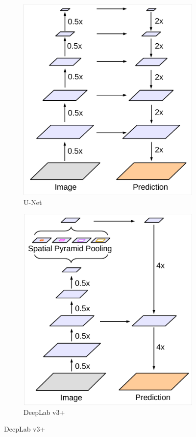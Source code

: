 \begin{description}
\begin{figure}[H]
\begin{subfigure}{0.3\linewidth}
                \includegraphics[width=0.9\linewidth]{./img/_deeplabv3plus_2.pdf}
                \caption{U-Net}
            \end{subfigure}
            \hfill
            \begin{subfigure}{0.3\linewidth}
                \centering
                \includegraphics[width=0.9\linewidth]{./img/_deeplabv3plus_3.pdf}
                \caption{DeepLab v3+}
            \end{subfigure}
        \end{figure}
\end{description}